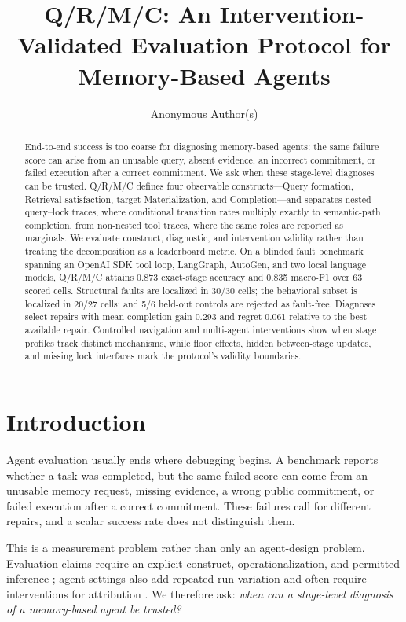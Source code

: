 \documentclass{article}
\title{Q/R/M/C: An Intervention-Validated Evaluation Protocol for Memory-Based Agents}
\author{Anonymous Author(s)}
\date{}
\newcommand{\qrmc}{Q/R/M/C}
\begin{document}
\maketitle

\begin{abstract}
End-to-end success is too coarse for diagnosing memory-based agents: the same failure score can arise from an unusable query, absent evidence, an incorrect commitment, or failed execution after a correct commitment. We ask when these stage-level diagnoses can be trusted. \qrmc{} defines four observable constructs---Query formation, Retrieval satisfaction, target Materialization, and Completion---and separates nested query--lock traces, where conditional transition rates multiply exactly to semantic-path completion, from non-nested tool traces, where the same roles are reported as marginals. We evaluate construct, diagnostic, and intervention validity rather than treating the decomposition as a leaderboard metric. On a blinded fault benchmark spanning an OpenAI SDK tool loop, LangGraph, AutoGen, and two local language models, \qrmc{} attains 0.873 exact-stage accuracy and 0.835 macro-F1 over 63 scored cells. Structural faults are localized in 30/30 cells; the behavioral subset is localized in 20/27 cells; and 5/6 held-out controls are rejected as fault-free. Diagnoses select repairs with mean completion gain 0.293 and regret 0.061 relative to the best available repair. Controlled navigation and multi-agent interventions show when stage profiles track distinct mechanisms, while floor effects, hidden between-stage updates, and missing lock interfaces mark the protocol's validity boundaries.
\end{abstract}

\section{Introduction}

Agent evaluation usually ends where debugging begins. A benchmark reports whether a task was completed, but the same failed score can come from an unusable memory request, missing evidence, a wrong public commitment, or failed execution after a correct commitment. These failures call for different repairs, and a scalar success rate does not distinguish them.

This is a measurement problem rather than only an agent-design problem. Evaluation claims require an explicit construct, operationalization, and permitted inference \citep{raji2021everything,bean2025construct}; agent settings also add repeated-run variation \citep{bjarnason2026randomness} and often require interventions for attribution \citep{lin2026reflect}. We therefore ask: \emph{when can a stage-level diagnosis of a memory-based agent be trusted?}
\end{document}

